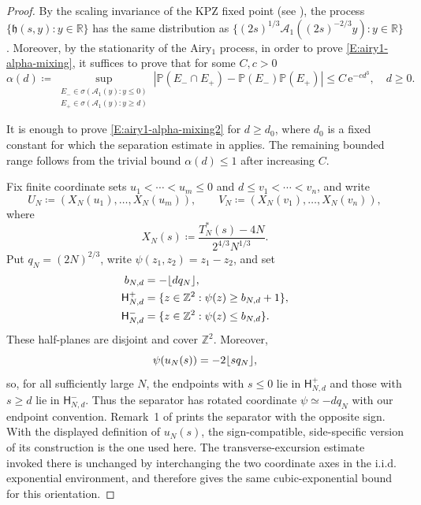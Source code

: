\documentclass[12pt, reqno]{amsart}
\numberwithin{equation}{section}
\theoremstyle{definition}
\newcommand{\R}{\mathbb{R}}
\newcommand{\Z}{\mathbb{Z}}
\newcommand{\h}{\mathfrak{h}}
\newcommand{\Prob}{\mathbb{P}}
\newcommand{\e}{\,\mathrm{e}}
\DeclarePairedDelimiter{\floor}{\lfloor}{\rfloor}
\begin{document}
\begin{proof}
  By the scaling invariance of the KPZ fixed point (see \cite[Theorem
  4.5(i)]{matetski.quastel.ea:21:kpz}), the process $\{\h(s,y): y\in \R\}$ has
  the same distribution as $\{(2s)^{1/3}\mathcal{A}_1((2s)^{-2/3}y): y\in \R\}$.
  Moreover, by the stationarity of the Airy$_1$ process, in order to prove
  \eqref{E:airy1-alpha-mixing}, it suffices to prove that for some $C, c>0$
  \begin{equation}
    \alpha(d) \coloneqq 
    \sup_{\substack{
    E_-\in\sigma(\mathcal{A}_1(y):y\le 0)\\
    E_+\in\sigma(\mathcal{A}_1(y):y\ge d)}}
    |\Prob(E_-\cap E_+)-\Prob(E_-)\Prob(E_+)|
    \le
    C \e^{-c d^3},
    \quad d\ge0.
    \label{E:airy1-alpha-mixing2}
  \end{equation}

  It is enough to prove \eqref{E:airy1-alpha-mixing2} for $d\ge d_0$, where
  $d_0$ is a fixed constant for which the separation estimate in
  \cite[Remark~1]{basu.bhattacharjee:24:limit} applies. The remaining bounded
  range follows from the trivial bound $\alpha(d)\le1$ after increasing $C$.

  Fix finite coordinate sets $u_1<\cdots<u_m\le0$ and
  $d\le v_1<\cdots<v_n$, and write
  \[
    U_N \coloneqq (X_N(u_1),\ldots,X_N(u_m)),
    \qquad
    V_N \coloneqq (X_N(v_1),\ldots,X_N(v_n)),
  \]
  where
  \[
    X_N(s) \coloneqq \frac{T_N^*(s)-4N}{2^{4/3}N^{1/3}}.
  \]
  Put $q_N=(2N)^{2/3}$, write $\psi(z_1,z_2)=z_1-z_2$, and set
  \begin{align*}
    b_{N,d}&=-\floor{dq_N},\\
    \mathsf H^+_{N,d}&=\{z\in\Z^2:\psi(z)\ge b_{N,d}+1\},\\
    \mathsf H^-_{N,d}&=\{z\in\Z^2:\psi(z)\le b_{N,d}\}.
  \end{align*}
  These half-planes are disjoint and cover $\Z^2$. Moreover,
  \[
    \psi(u_N(s))=-2\floor{s q_N},
  \]
  so, for all sufficiently large $N$, the endpoints with $s\le0$ lie in
  $\mathsf H^+_{N,d}$ and those with $s\ge d$ lie in $\mathsf H^-_{N,d}$. Thus
  the separator has rotated coordinate $\psi\simeq-dq_N$ with our endpoint
  convention. Remark~1 of \cite{basu.bhattacharjee:24:limit} prints the
  separator with the opposite sign. With the displayed definition of $u_N(s)$,
  the sign-compatible, side-specific version of its construction is the one
  used here. The transverse-excursion estimate invoked there is unchanged by
  interchanging the two coordinate axes in the i.i.d. exponential environment,
  and therefore gives the same cubic-exponential bound for this orientation.


\end{proof}
\end{document}
